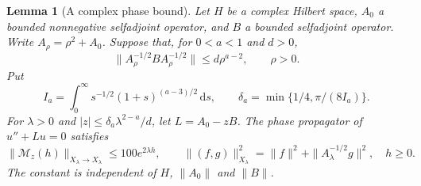 \documentclass[12pt,oneside,openany]{book}
\makeatletter
\let\lean@pending\@empty
\newcommand{\LeanMarker}[1]{\gdef\lean@pending{#1}}
\numberwithin{equation}{section}
\newtheorem{lemma}[theorem]{Lemma}
\theoremstyle{nogostyle}
\theoremstyle{definition}
\newcommand{\ud}{\,\mathrm{d}}
\makeatother
\begin{document}
\LeanMarker{L:complex-phase}
\begin{lemma}[A complex phase bound]\label{L:complex-phase}
  Let $H$ be a complex Hilbert space, $A_0$ a bounded nonnegative selfadjoint
  operator, and $B$ a bounded selfadjoint operator. Write $A_\rho = \rho^2+A_0$.
  Suppose that, for $0 < a < 1$ and $d > 0$,
  \begin{equation}\label{E:abstract-sandwich}
    \|A_\rho^{-1/2}BA_\rho^{-1/2}\|\le d\rho^{a-2},
    \qquad \rho>0.
  \end{equation}
  Put
  \[
    I_a=\int_0^\infty s^{-1/2}(1+s)^{(a-3)/2}\ud s,\qquad
    \delta_a=\min\{1/4,\pi/(8I_a)\}.
  \]
  For $\lambda > 0$ and $|z| \le \delta_a\lambda^{2-a}/d$, let $L = A_0-zB$. The
  phase propagator of $u''+Lu = 0$ satisfies
  \begin{equation}\label{E:complex-phase-bound}
    \|\mathcal{M}_z(h)\|_{X_\lambda\to X_\lambda}
    \le100e^{2\lambda h},\qquad
    \|(f,g)\|_{X_\lambda}^2
    =\|f\|^2+\|A_\lambda^{-1/2}g\|^2,\quad h\ge0.
  \end{equation}
  The constant is independent of $H$, $\|A_0\|$ and $\|B\|$.
\end{lemma}
\end{document}

